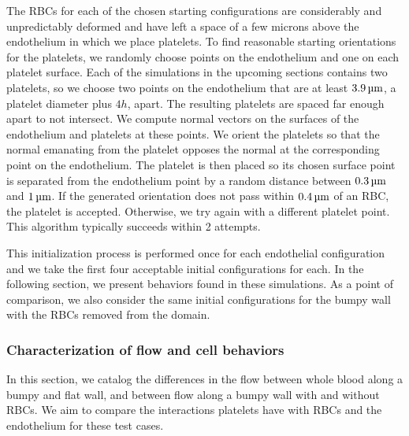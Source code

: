 The RBCs for each of the chosen starting configurations are considerably and unpredictably deformed and have left
a space of a few microns above the endothelium in which we place platelets. To find reasonable starting
orientations for the platelets, we randomly choose points on the endothelium and one on each platelet surface.
Each of the simulations in the upcoming sections contains two platelets, so we choose two points on the
endothelium that are at least $3.9\um$, a platelet diameter plus $4h$, apart. The resulting platelets are spaced
far enough apart to not intersect. We compute normal vectors on the surfaces of the endothelium and platelets at
these points. We orient the platelets so that the normal emanating from the platelet opposes the normal at the
corresponding point on the endothelium. The platelet is then placed so its chosen surface point is separated from
the endothelium point by a random distance between $0.3\um$ and $1\um$. If the generated orientation does not pass
within $0.4\um$ of an RBC, the platelet is accepted. Otherwise, we try again with a different platelet point. This
algorithm typically succeeds within 2 attempts.

This initialization process is performed once for each endothelial configuration and we take the first four
acceptable initial configurations for each. In the following section, we present behaviors found in these
simulations. As a point of comparison, we also consider the same initial configurations for the bumpy wall with
the RBCs removed from the domain.

\subsubsection{Characterization of flow and cell behaviors}

In this section, we catalog the differences in the flow between whole blood along a bumpy and flat wall, and
between flow along a bumpy wall with and without RBCs. We aim to compare the interactions platelets have with RBCs
and the endothelium for these test cases.

